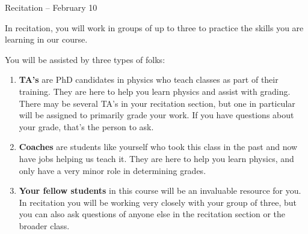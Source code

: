 \documentclass[12pt]{article}
\newcommand{\BE}{\begin{enumerate}}
\newcommand{\EE}{\end{enumerate}}
\begin{document}
	\begin{center}\sc \Large Recitation -- February 10 \end{center}
	
	In recitation, you will work in groups of up to three to practice the skills you are learning in our course. 
	
	
	You will be assisted by three types of folks:
	
	\BE
	\item {\bf TA's} are PhD candidates in physics who teach classes as part of their training. They are here to help you learn physics and assist with grading. There may be several TA's in your recitation section, but one in particular will be assigned to primarily grade your work. If you have questions about your grade, that's the person to ask.
	
	\item {\bf Coaches} are students like yourself who took this class in the past and now have jobs helping us teach it. They are here to help you learn physics, and only have a very minor role in determining grades.
	
	\item {\bf Your fellow students} in this course will be an invaluable resource for you. In recitation you will be working very closely with your group of three, but you can also ask questions of anyone else in the recitation section or the broader class. 
	\EE
	
	
	
	
	
\end{document}
